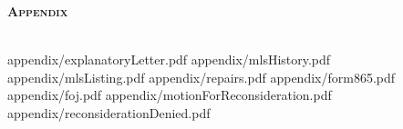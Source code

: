 \documentclass[12pt,\documentclassflag]{article}
\begin{document}
\newpage 

\begin{centering}
  \bf\scshape Appendix \\~\\
  \rm 
\end{centering}

\tableofcontents
\newpage
\renewcommand{\footrulewidth}{0.4pt}
\renewcommand{\subsectionmark}[1]{\markright{/#1}} %

\newcommand{\addLabelsToAllIncludedPages}[1]{%
   \refstepcounter{includepdfpage}%
   \stepcounter{currentpagecounter}%
   \label{#1.\thecurrentpagecounter}}%

\newcommand{\myincludepdf}[2]{%
  \setcounter{currentpagecounter}{0}%
  {appendix/#1.pdf}}%
  
  
\renewcommand{\sectionmark}[1]{\markboth{#1}{/Explanatory Letter}} %
\myincludepdf{explanatoryLetter}{1,section,1,Submitted Evidence,evidence,1,subsection,2,Explanatory Letter}
\myincludepdf{mlsHistory}{1,subsection,2,MLS History}
\myincludepdf{mlsListing}{1,subsection,2,MLS Listing Sheet}
\myincludepdf{repairs}{1,subsection,2,List of Repairs}
\myincludepdf{form865}{1,subsection,2,Form 865 Mathieu Gast Nonconsideration}
\renewcommand{\sectionmark}[1]{\markboth{#1}{}} %
\myincludepdf{foj}{1,section,1,Final Opinion and Judgement}
\myincludepdf{motionForReconsideration}{1,section,1,Motion For Reconsideration}
\myincludepdf{reconsiderationDenied}{1,section,1,Reconsideration Denied}

\newpage\empty%
\end{document}
